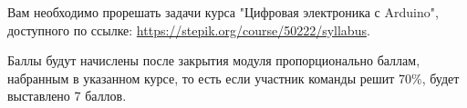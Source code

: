 
Вам необходимо прорешать задачи курса "Цифровая электроника с Arduino", доступного по ссылке: \url{https://stepik.org/course/50222/syllabus}.

\markSection

Баллы будут начислены после закрытия модуля пропорционально баллам, набранным в указанном курсе, то есть если участник команды решит 70\%, будет выставлено 7 баллов. 
